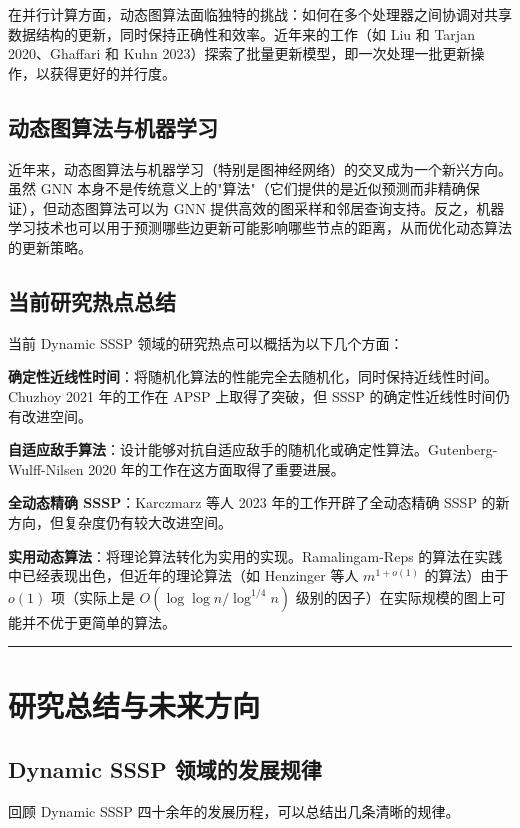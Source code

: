\documentclass[12pt,a4paper]{ctexart}
\let\oldsection\section
\renewcommand{\section}{\clearpage\oldsection}
\begin{document}
在并行计算方面，动态图算法面临独特的挑战：如何在多个处理器之间协调对共享数据结构的更新，同时保持正确性和效率。近年来的工作（如 Liu 和 Tarjan 2020、Ghaffari 和 Kuhn 2023）探索了批量更新模型，即一次处理一批更新操作，以获得更好的并行度。

\subsection{动态图算法与机器学习}

近年来，动态图算法与机器学习（特别是图神经网络）的交叉成为一个新兴方向。虽然 GNN 本身不是传统意义上的"算法"（它们提供的是近似预测而非精确保证），但动态图算法可以为 GNN 提供高效的图采样和邻居查询支持。反之，机器学习技术也可以用于预测哪些边更新可能影响哪些节点的距离，从而优化动态算法的更新策略。

\subsection{当前研究热点总结}

当前 Dynamic SSSP 领域的研究热点可以概括为以下几个方面：

\textbf{确定性近线性时间}：将随机化算法的性能完全去随机化，同时保持近线性时间。Chuzhoy 2021 年的工作在 APSP 上取得了突破，但 SSSP 的确定性近线性时间仍有改进空间。

\textbf{自适应敌手算法}：设计能够对抗自适应敌手的随机化或确定性算法。Gutenberg-Wulff-Nilsen 2020 年的工作在这方面取得了重要进展。

\textbf{全动态精确 SSSP}：Karczmarz 等人 2023 年的工作开辟了全动态精确 SSSP 的新方向，但复杂度仍有较大改进空间。

\textbf{实用动态算法}：将理论算法转化为实用的实现。Ramalingam-Reps 的算法在实践中已经表现出色，但近年的理论算法（如 Henzinger 等人 $m^{1+o(1)}$ 的算法）由于 $o(1)$ 项（实际上是 $O(\log\log n/\log^{1/4}n)$ 级别的因子）在实际规模的图上可能并不优于更简单的算法。

\noindent\rule{\textwidth}{0.4pt}
\section{研究总结与未来方向}

\subsection{Dynamic SSSP 领域的发展规律}

回顾 Dynamic SSSP 四十余年的发展历程，可以总结出几条清晰的规律。
\end{document}
